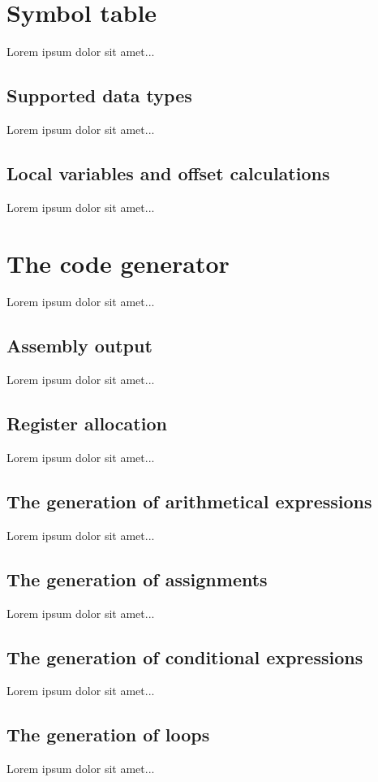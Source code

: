 \documentclass[a4paper]{report}
\begin{document}
  \chapter{Symbol table}
    Lorem ipsum dolor sit amet...		

    \section{Supported data types}
      Lorem ipsum dolor sit amet...
		
    \section{Local variables and offset calculations}
      Lorem ipsum dolor sit amet...

  \chapter{The code generator}
     Lorem ipsum dolor sit amet...

    \section{Assembly output}
      Lorem ipsum dolor sit amet...

    \section{Register allocation}
      Lorem ipsum dolor sit amet...

    \section{The generation of arithmetical expressions}
      Lorem ipsum dolor sit amet...

    \section{The generation of assignments}
      Lorem ipsum dolor sit amet...

    \section{The generation of conditional expressions}
      Lorem ipsum dolor sit amet...

    \section{The generation of loops}
      Lorem ipsum dolor sit amet...
\end{document}
